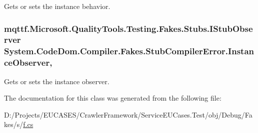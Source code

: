 Gets or sets the instance behavior.

\hypertarget{class_system_1_1_code_dom_1_1_compiler_1_1_fakes_1_1_stub_compiler_error_a9575bfcbf350f5f2644e31ccb5e450c2}{
\subsubsection[{Instance\-Observer}]{\setlength{\rightskip}{0pt plus 5cm}mqttf.\-Microsoft.\-Quality\-Tools.\-Testing.\-Fakes.\-Stubs.\-I\-Stub\-Observer System.\-Code\-Dom.\-Compiler.\-Fakes.\-Stub\-Compiler\-Error.\-Instance\-Observer\hspace{0.3cm}{\ttfamily [get]}, {\ttfamily [set]}}}\label{class_system_1_1_code_dom_1_1_compiler_1_1_fakes_1_1_stub_compiler_error_a9575bfcbf350f5f2644e31ccb5e450c2}


Gets or sets the instance observer.



The documentation for this class was generated from the following file\-:\begin{DoxyCompactItemize}
\item 
D\-:/\-Projects/\-E\-U\-C\-A\-S\-E\-S/\-Crawler\-Framework/\-Service\-E\-U\-Cases.\-Test/obj/\-Debug/\-Fakes/s/\hyperlink{s_2f_8cs}{f.\-cs}\end{DoxyCompactItemize}
